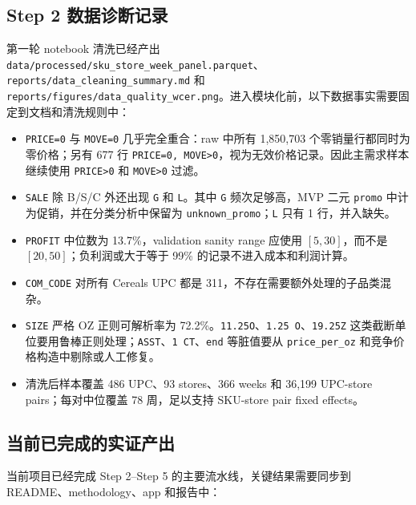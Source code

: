 \documentclass[UTF8,11pt,a4paper,fontset=none]{ctexart}
\begin{document}
\subsection{Step 2 数据诊断记录}

第一轮 notebook 清洗已经产出 \texttt{data/processed/sku\_store\_week\_panel.parquet}、\texttt{reports/data\_cleaning\_summary.md} 和 \texttt{reports/figures/data\_quality\_wcer.png}。进入模块化前，以下数据事实需要固定到文档和清洗规则中：

\begin{itemize}
  \item \texttt{PRICE=0} 与 \texttt{MOVE=0} 几乎完全重合：raw 中所有 1,850,703 个零销量行都同时为零价格；另有 677 行 \texttt{PRICE=0, MOVE>0}，视为无效价格记录。因此主需求样本继续使用 \texttt{PRICE>0} 和 \texttt{MOVE>0} 过滤。
  \item \texttt{SALE} 除 B/S/C 外还出现 \texttt{G} 和 \texttt{L}。其中 \texttt{G} 频次足够高，MVP 二元 \texttt{promo} 中计为促销，并在分类分析中保留为 \texttt{unknown\_promo}；\texttt{L} 只有 1 行，并入缺失。
  \item \texttt{PROFIT} 中位数为 13.7\%，validation sanity range 应使用 $[5,30]$，而不是 $[20,50]$；负利润或大于等于 99\% 的记录不进入成本和利润计算。
  \item \texttt{COM\_CODE} 对所有 Cereals UPC 都是 311，不存在需要额外处理的子品类混杂。
  \item \texttt{SIZE} 严格 OZ 正则可解析率为 72.2\%。\texttt{11.25O}、\texttt{1.25 O}、\texttt{19.25Z} 这类截断单位要用鲁棒正则处理；\texttt{ASST}、\texttt{1 CT}、\texttt{end} 等脏值要从 \texttt{price\_per\_oz} 和竞争价格构造中剔除或人工修复。
  \item 清洗后样本覆盖 486 UPC、93 stores、366 weeks 和 36,199 UPC-store pairs；每对中位覆盖 78 周，足以支持 SKU-store pair fixed effects。
\end{itemize}

\subsection{当前已完成的实证产出}

当前项目已经完成 Step 2--Step 5 的主要流水线，关键结果需要同步到 README、methodology、app 和报告中：
\end{document}
